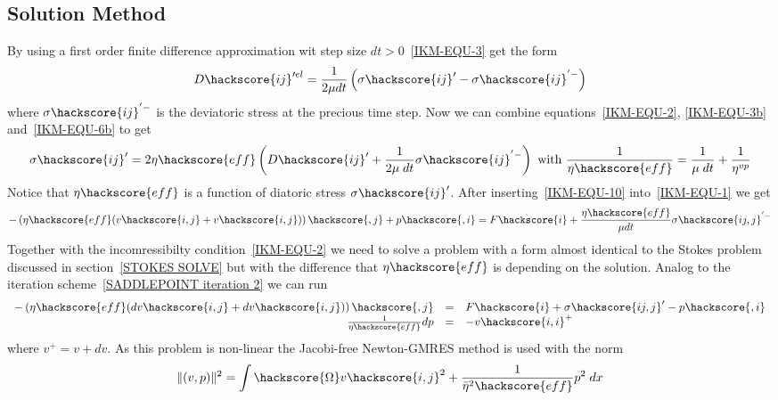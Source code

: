 \subsection{Solution Method \label{IKM-SOLVE}}
By using a first order finite difference approximation wit step size $dt>0$~\ref{IKM-EQU-3} get the form
\begin{equation}\label{IKM-EQU-3b}
D\hackscore{ij}'^{el}=\frac{1}{2 \mu dt } \left( \sigma\hackscore{ij}' - \sigma\hackscore{ij}^{'-} \right)
\end{equation}
where $\sigma\hackscore{ij}^{'-}$ is the deviatoric stress at the precious time step.
Now we can combine equations~\ref{IKM-EQU-2}, \ref{IKM-EQU-3b} and~\ref{IKM-EQU-6b} to get
\begin{equation}\label{IKM-EQU-10}
\sigma\hackscore{ij}' =  2 \eta\hackscore{eff}  \left( D\hackscore{ij}' + 
\frac{1}{  2 \mu \; dt} \sigma\hackscore{ij}^{'-}\right)  \mbox{ with }
\frac{1}{\eta\hackscore{eff}}=\frac{1}{\mu \; dt}+\frac{1}{\eta^{vp}}
\end{equation}
Notice that $\eta\hackscore{eff}$ is a function of diatoric stress $\sigma\hackscore{ij}'$.
After inserting~\ref{IKM-EQU-10} into~\ref{IKM-EQU-1} we get
\begin{equation}\label{IKM-EQU-1ib}
-\left(\eta\hackscore{eff} (v\hackscore{i,j}+ v\hackscore{i,j})
\right)\hackscore{,j}+p\hackscore{,i}=F\hackscore{i}+
\frac{\eta\hackscore{eff}}{\mu dt } \sigma\hackscore{ij,j}^{'-}
\end{equation}
Together with the incomressibilty condition~\ref{IKM-EQU-2} we need to solve a problem with a form almost identical 
to the Stokes problem discussed in section~\ref{STOKES SOLVE} but with the difference that $\eta\hackscore{eff}$ is depending on the solution. Analog to the iteration scheme~\ref{SADDLEPOINT iteration 2} we can run
\begin{equation}
\begin{array}{rcl}
-\left(\eta\hackscore{eff}(dv\hackscore{i,j}+ dv\hackscore{i,j}
)\right)\hackscore{,j} & = & F\hackscore{i}+ \sigma\hackscore{ij,j}'-p\hackscore{,i} \\
\frac{1}{\eta\hackscore{eff}} dp & = & - v\hackscore{i,i}^+
\end{array}
\label{IKM iteration 2}
\end{equation}
where $v^+=v+dv$. As this problem is non-linear the Jacobi-free Newton-GMRES method is used with the norm
\begin{equation}
\|(v, p)\|^2= \int\hackscore{\Omega} v\hackscore{i,j}^2 + \frac{1}{\bar{\eta}^2\hackscore{eff}} p^2 \; dx
\label{IKM iteration 3}
\end{equation}

